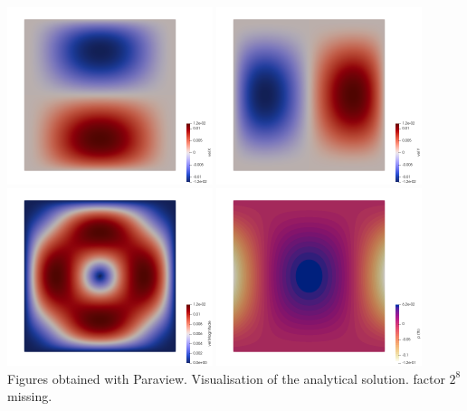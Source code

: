 \begin{center}
\includegraphics[width=6cm]{python_codes/fieldstone_161/results/bench2/th_u}
\includegraphics[width=6cm]{python_codes/fieldstone_161/results/bench2/th_v}\\
\includegraphics[width=6cm]{python_codes/fieldstone_161/results/bench2/th_vel}
\includegraphics[width=6cm]{python_codes/fieldstone_161/results/bench2/th_press}\\
{\captionfont Figures obtained with Paraview. Visualisation of the analytical solution. 
factor $2^8$ missing.}
\end{center}

